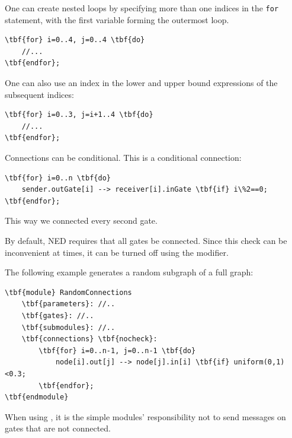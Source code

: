 One can create nested loops
by specifying more than one indices in the \texttt{for} statement,
with the first variable forming the outermost loop.

\begin{Verbatim}[commandchars=\\\{\}]
\tbf{for} i=0..4, j=0..4 \tbf{do}
    //...
\tbf{endfor};
\end{Verbatim}

One can also use an index in the lower and upper bound expressions
of the subsequent indices:

\begin{Verbatim}[commandchars=\\\{\}]
\tbf{for} i=0..3, j=i+1..4 \tbf{do}
    //...
\tbf{endfor};
\end{Verbatim}




Connections can be conditional. This is a conditional connection:


\begin{Verbatim}[commandchars=\\\{\}]
\tbf{for} i=0..n \tbf{do}
    sender.outGate[i] --> receiver[i].inGate \tbf{if} i\%2==0;
\tbf{endfor};
\end{Verbatim}

This way we connected every second gate.



By default, NED requires that all gates be connected. Since this
check can be inconvenient at times, it can be turned off
using the  modifier.

The following example generates a random subgraph of a full graph:

\begin{Verbatim}[commandchars=\\\{\}]
\tbf{module} RandomConnections
    \tbf{parameters}: //..
    \tbf{gates}: //..
    \tbf{submodules}: //..
    \tbf{connections} \tbf{nocheck}:
        \tbf{for} i=0..n-1, j=0..n-1 \tbf{do}
            node[i].out[j] --> node[j].in[i] \tbf{if} uniform(0,1)<0.3;
        \tbf{endfor};
\tbf{endmodule}
\end{Verbatim}

When using , it is the
simple modules' responsibility not to send messages on gates
that are not connected.



